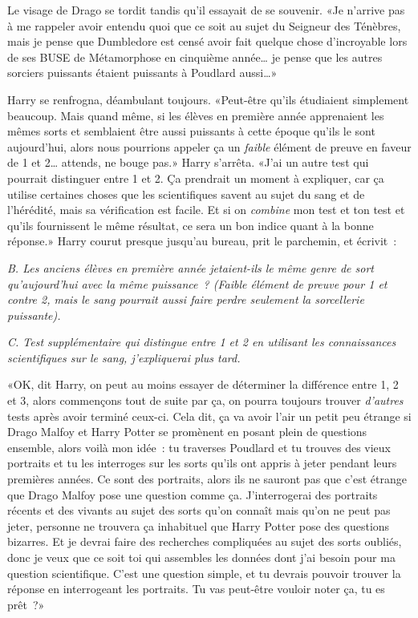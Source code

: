 Le visage de Drago se tordit tandis qu'il essayait de se souvenir. «Je n'arrive pas à me rappeler avoir entendu quoi que ce soit au sujet du Seigneur des Ténèbres, mais je pense que Dumbledore est censé avoir fait quelque chose d'incroyable lors de ses BUSE de Métamorphose en cinquième année… je pense que les autres sorciers puissants étaient puissants à Poudlard aussi…»

Harry se renfrogna, déambulant toujours. «Peut-être qu'ils étudiaient simplement beaucoup. Mais quand même, si les élèves en première année apprenaient les mêmes sorts et semblaient être aussi puissants à cette époque qu'ils le sont aujourd'hui, alors nous pourrions appeler ça un \emph{faible} élément de preuve en faveur de 1 et 2… attends, ne bouge pas.» Harry s'arrêta. «J'ai un autre test qui pourrait distinguer entre 1 et 2. Ça prendrait un moment à expliquer, car ça utilise certaines choses que les scientifiques savent au sujet du sang et de l'hérédité, mais sa vérification est facile. Et si on \emph{combine} mon test et ton test et qu'ils fournissent le même résultat, ce sera un bon indice quant à la bonne réponse.» Harry courut presque jusqu'au bureau, prit le parchemin, et écrivit~:

\emph{B. Les anciens élèves en première année jetaient-ils le même genre de sort qu'aujourd'hui avec la même puissance~? (Faible élément de preuve pour 1 et contre 2, mais le sang pourrait aussi faire perdre seulement la sorcellerie puissante).}

\emph{C. Test supplémentaire qui distingue entre 1 et 2 en utilisant les connaissances scientifiques sur le sang, j'expliquerai plus tard.}

«OK, dit Harry, on peut au moins essayer de déterminer la différence entre 1, 2 et 3, alors commençons tout de suite par ça, on pourra toujours trouver \emph{d'autres} tests après avoir terminé ceux-ci. Cela dit, ça va avoir l'air un petit peu étrange si Drago Malfoy et Harry Potter se promènent en posant plein de questions ensemble, alors voilà mon idée~: tu traverses Poudlard et tu trouves des vieux portraits et tu les interroges sur les sorts qu'ils ont appris à jeter pendant leurs premières années. Ce sont des portraits, alors ils ne sauront pas que c'est étrange que Drago Malfoy pose une question comme ça. J'interrogerai des portraits récents et des vivants au sujet des sorts qu'on connaît mais qu'on ne peut pas jeter, personne ne trouvera ça inhabituel que Harry Potter pose des questions bizarres. Et je devrai faire des recherches compliquées au sujet des sorts oubliés, donc je veux que ce soit toi qui assembles les données dont j'ai besoin pour ma question scientifique. C'est une question simple, et tu devrais pouvoir trouver la réponse en interrogeant les portraits. Tu vas peut-être vouloir noter ça, tu es prêt~?»

